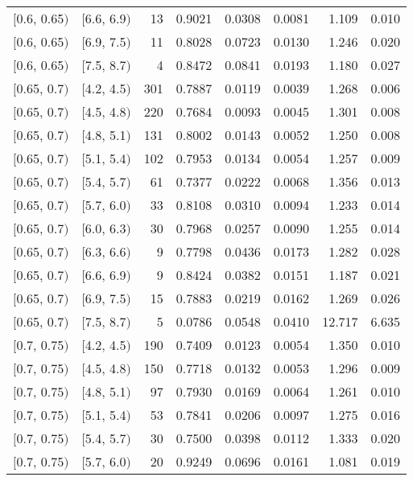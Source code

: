 \begin{longtable}{| l | l | r | r | r | r | r | r |}
        $[$0.6, 0.65$)$ & $[$6.6, 6.9$)$ & 13 & 0.9021 & 0.0308 & 0.0081 & 1.109 & 0.010 \\
        $[$0.6, 0.65$)$ & $[$6.9, 7.5$)$ & 11 & 0.8028 & 0.0723 & 0.0130 & 1.246 & 0.020 \\
        $[$0.6, 0.65$)$ & $[$7.5, 8.7$)$ & 4 & 0.8472 & 0.0841 & 0.0193 & 1.180 & 0.027 \\
        $[$0.65, 0.7$)$ & $[$4.2, 4.5$)$ & 301 & 0.7887 & 0.0119 & 0.0039 & 1.268 & 0.006 \\
        $[$0.65, 0.7$)$ & $[$4.5, 4.8$)$ & 220 & 0.7684 & 0.0093 & 0.0045 & 1.301 & 0.008 \\
        $[$0.65, 0.7$)$ & $[$4.8, 5.1$)$ & 131 & 0.8002 & 0.0143 & 0.0052 & 1.250 & 0.008 \\
        $[$0.65, 0.7$)$ & $[$5.1, 5.4$)$ & 102 & 0.7953 & 0.0134 & 0.0054 & 1.257 & 0.009 \\
        $[$0.65, 0.7$)$ & $[$5.4, 5.7$)$ & 61 & 0.7377 & 0.0222 & 0.0068 & 1.356 & 0.013 \\
        $[$0.65, 0.7$)$ & $[$5.7, 6.0$)$ & 33 & 0.8108 & 0.0310 & 0.0094 & 1.233 & 0.014 \\
        $[$0.65, 0.7$)$ & $[$6.0, 6.3$)$ & 30 & 0.7968 & 0.0257 & 0.0090 & 1.255 & 0.014 \\
        $[$0.65, 0.7$)$ & $[$6.3, 6.6$)$ & 9 & 0.7798 & 0.0436 & 0.0173 & 1.282 & 0.028 \\
        $[$0.65, 0.7$)$ & $[$6.6, 6.9$)$ & 9 & 0.8424 & 0.0382 & 0.0151 & 1.187 & 0.021 \\
        $[$0.65, 0.7$)$ & $[$6.9, 7.5$)$ & 15 & 0.7883 & 0.0219 & 0.0162 & 1.269 & 0.026 \\
        $[$0.65, 0.7$)$ & $[$7.5, 8.7$)$ & 5 & 0.0786 & 0.0548 & 0.0410 & 12.717 & 6.635 \\
        $[$0.7, 0.75$)$ & $[$4.2, 4.5$)$ & 190 & 0.7409 & 0.0123 & 0.0054 & 1.350 & 0.010 \\
        $[$0.7, 0.75$)$ & $[$4.5, 4.8$)$ & 150 & 0.7718 & 0.0132 & 0.0053 & 1.296 & 0.009 \\
        $[$0.7, 0.75$)$ & $[$4.8, 5.1$)$ & 97 & 0.7930 & 0.0169 & 0.0064 & 1.261 & 0.010 \\
        $[$0.7, 0.75$)$ & $[$5.1, 5.4$)$ & 53 & 0.7841 & 0.0206 & 0.0097 & 1.275 & 0.016 \\
        $[$0.7, 0.75$)$ & $[$5.4, 5.7$)$ & 30 & 0.7500 & 0.0398 & 0.0112 & 1.333 & 0.020 \\
        $[$0.7, 0.75$)$ & $[$5.7, 6.0$)$ & 20 & 0.9249 & 0.0696 & 0.0161 & 1.081 & 0.019 \\

\end{longtable}
